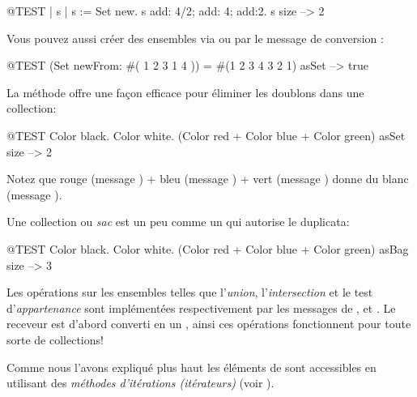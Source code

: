 \documentclass[a4paper,10pt,twoside]{book}
\begin{document}
\begin{code}{@TEST | s | }
s := Set new.
s add: 4/2; add: 4; add:2.
s size --> 2
\end{code}

Vous pouvez aussi cr\'eer des ensembles via  ou
par le message de conversion :

\begin{code}{@TEST}
(Set newFrom: #( 1 2 3 1 4 )) = #(1 2 3 4 3 2 1) asSet --> true
\end{code}

La m\'ethode  offre une fa\c{c}on efficace pour \'eliminer les doublons dans une collection:
\begin{code}{@TEST}
{ Color black. Color white. (Color red + Color blue + Color green) } asSet size --> 2
\end{code}
\noindent
Notez que rouge (message ) + bleu (message ) + vert (message ) donne du blanc (message ).

Une collection  ou \emph{sac} est un peu comme un  
qui autorise le duplicata:
\begin{code}{@TEST}
{ Color black. Color white. (Color red + Color blue + Color green) } asBag size --> 3
\end{code}

Les op\'erations sur les ensembles telles que
l'\emph{union}, l'\emph{intersection} et le test d'\emph{appartenance} 
sont impl\'ement\'ees respectivement par les messages de  ,  et .
Le receveur est d'abord converti en un , ainsi ces op\'erations fonctionnent pour toute sorte de collections!



Comme nous l'avons expliqu\'e plus haut les \'el\'ements de  sont
accessibles en utilisant des \emph{méthodes d'itérations (itérateurs)} (voir ).

\end{document}
